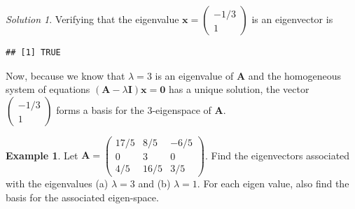 \documentclass[
]{book}
\newenvironment{Shaded}{\begin{snugshade}}{\end{snugshade}}
\newcommand{\CommentTok}[1]{\textcolor[rgb]{0.56,0.35,0.01}{\textit{#1}}}
\newcommand{\DecValTok}[1]{\textcolor[rgb]{0.00,0.00,0.81}{#1}}
\newcommand{\KeywordTok}[1]{\textcolor[rgb]{0.13,0.29,0.53}{\textbf{#1}}}
\newcommand{\NormalTok}[1]{#1}
\newcommand{\OperatorTok}[1]{\textcolor[rgb]{0.81,0.36,0.00}{\textbf{#1}}}
\newcommand{\StringTok}[1]{\textcolor[rgb]{0.31,0.60,0.02}{#1}}
\theoremstyle{definition}
\theoremstyle{definition}
\newtheorem{example}{Example}[chapter]
\theoremstyle{definition}
\theoremstyle{definition}
\theoremstyle{remark}
\newtheorem*{solution}{Solution}
\begin{document}
\begin{solution}
Verifying that the eigenvalue \(\mathbf{x} = \begin{pmatrix} -1/3 \\ 1 \end{pmatrix}\) is an eigenvector is

\begin{Shaded}
\end{Shaded}

\begin{verbatim}
## [1] TRUE
\end{verbatim}

Now, because we know that \(\lambda = 3\) is an eigenvalue of \(\mathbf{A}\) and the homogeneous system of equations \(\left(\mathbf{A} - \lambda \mathbf{I} \right) \mathbf{x} = \mathbf{0}\) has a unique solution, the vector \(\begin{pmatrix} -1/3 \\ 1 \end{pmatrix}\) forms a basis for the 3-eigenspace of \(\mathbf{A}\).
\end{solution}

\begin{example}
Let \(\mathbf{A} = \begin{pmatrix} 17/5 & 8/5 & -6/5 \\ 0 & 3 & 0 \\ 4/5 & 16/5 & 3/5 \end{pmatrix}\). Find the eigenvectors associated with the eigenvalues (a) \(\lambda = 3\) and (b) \(\lambda = 1\). For each eigen value, also find the basis for the associated eigen-space.
\end{example}
\end{document}
